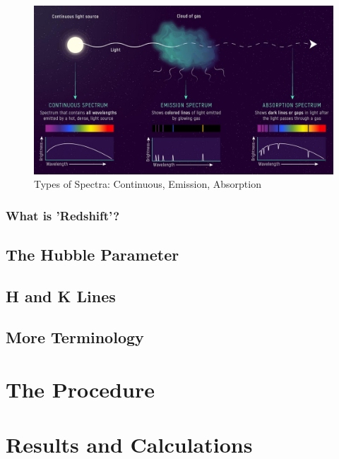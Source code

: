\documentclass[12pt]{article}
\begin{document}
\begin{figure}[H]
    \centering
    \includegraphics[width=\textwidth]{spectra.jpg}
    \caption{\centering \footnotesize{Types of Spectra: Continuous, Emission, Absorption \protect\cite{spectrapic}}}
    \label{fig:spectra}
\end{figure}

\subsubsection{What is 'Redshift'?}

\subsection{The Hubble Parameter} \label{sec:1.3}

\subsection{H and K Lines} \label{sec:1.4}

\subsection{More Terminology} \label{sec:1.5}

\section{The Procedure} 



\section{Results and Calculations}
\end{document}
